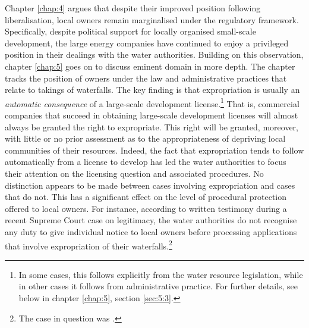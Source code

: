 Chapter \ref{chap:4} argues that despite their improved position following liberalisation, local owners remain marginalised under the regulatory framework. Specifically, despite political support for locally organised small-scale development, the large energy companies have continued to enjoy a privileged position in their dealings with the water authorities. Building on this observation, chapter \ref{chap:5} goes on to discuss eminent domain in more depth. The chapter tracks the position of owners under the law and administrative practices that relate to takings of waterfalls. The key finding is that expropriation is usually an {\it automatic consequence} of a large-scale development license.\footnote{In some cases, this follows explicitly from the water resource legislation, while in other cases it follows from administrative practice. For further details, see below in chapter \ref{chap:5}, section \ref{sec:5:3}.} That is, commercial companies that succeed in obtaining large-scale development licenses will almost always be granted the right to expropriate. This right will be granted, moreover, with little or no prior assessment as to the appropriateness of depriving local communities of their resources. Indeed, the fact that expropriation tends to follow automatically from a license to develop has led the water authorities to focus their attention on the licensing question and associated procedures. No distinction appears to be made between cases involving expropriation and cases that do not. This has a significant effect on the level of procedural protection offered to local owners. For instance, according to written testimony during a recent Supreme Court case on legitimacy, the water authorities do not recognise any duty to give individual notice to local owners before processing applications that involve expropriation of their waterfalls.\footnote{The case in question was \cite{jorpeland11}.}

